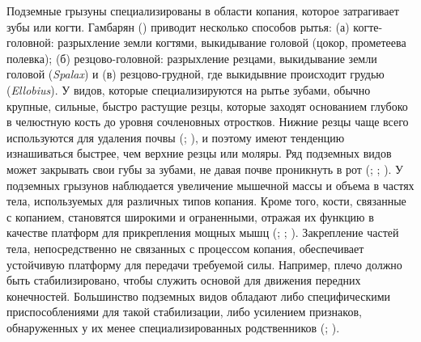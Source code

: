 Подземные грызуны специализированы в области копания, которое затрагивает зубы или когти. Гамбарян (\cite{Gambaryan1960}) приводит несколько способов рытья: (а) когте-головной: разрыхление земли когтями, выкидывание головой (цокор, прометеева полевка); (б) резцово-головной: разрыхление резцами, выкидывание земли головой (\textit{Spalax}) и (в) резцово-грудной, где выкидывние происходит грудью (\textit{Ellobius}). У видов, которые специализируются на рытье зубами, обычно крупные, сильные, быстро растущие резцы, которые заходят основанием глубоко в челюстную кость до уровня сочленовных отростков. Нижние резцы чаще всего используются для удаления почвы (\cite{Gambaryan1960}; \cite{Hildebrand1985}), и поэтому имеют тенденцию изнашиваться быстрее, чем верхние резцы или моляры. Ряд подземных видов может закрывать свои губы за зубами, не давая почве проникнуть в рот (\cite{Gambaryan1960}; \cite{Nevo1979}; \cite{Hildebrand1985}). У подземных грызунов наблюдается увеличение мышечной массы и объема в частях тела, используемых для различных типов копания. Кроме того, кости, связанные с копанием, становятся широкими и ограненными, отражая их функцию в качестве платформ для прикрепления мощных мышц (\cite{Gambaryan1960}; \cite{Lehmann1963}; \cite{Yalden2009}). Закрепление частей тела, непосредственно не связанных с процессом копания, обеспечивает устойчивую платформу для передачи требуемой силы. Например, плечо должно быть стабилизировано, чтобы служить основой для движения передних конечностей. Большинство подземных видов обладают либо специфическими приспособлениями для такой стабилизации, либо усилением признаков, обнаруженных у их менее специализированных родственников (\cite{Gambaryan1960}; \cite{Puttick1977}).





